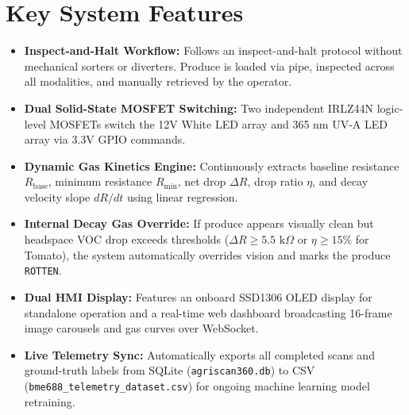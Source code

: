 \documentclass[11pt,a4paper]{article}
\begin{document}
\section{Key System Features}
\begin{itemize}[leftmargin=*]
    \item \textbf{Inspect-and-Halt Workflow:} Follows an inspect-and-halt protocol without mechanical sorters or diverters. Produce is loaded via pipe, inspected across all modalities, and manually retrieved by the operator.
    \item \textbf{Dual Solid-State MOSFET Switching:} Two independent IRLZ44N logic-level MOSFETs switch the 12V White LED array and 365 nm UV-A LED array via 3.3V GPIO commands.
    \item \textbf{Dynamic Gas Kinetics Engine:} Continuously extracts baseline resistance $R_{\text{base}}$, minimum resistance $R_{\text{min}}$, net drop $\Delta R$, drop ratio $\eta$, and decay velocity slope $dR/dt$ using linear regression.
    \item \textbf{Internal Decay Gas Override:} If produce appears visually clean but headspace VOC drop exceeds thresholds ($\Delta R \ge 5.5\text{ k}\Omega$ or $\eta \ge 15\%$ for Tomato), the system automatically overrides vision and marks the produce \texttt{ROTTEN}.
    \item \textbf{Dual HMI Display:} Features an onboard SSD1306 OLED display for standalone operation and a real-time web dashboard broadcasting 16-frame image carousels and gas curves over WebSocket.
    \item \textbf{Live Telemetry Sync:} Automatically exports all completed scans and ground-truth labels from SQLite (\texttt{agriscan360.db}) to CSV (\texttt{bme688\_telemetry\_dataset.csv}) for ongoing machine learning model retraining.
\end{itemize}

\end{document}
